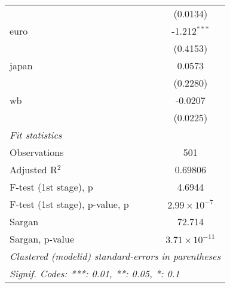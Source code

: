 \begin{tabular}{lc}
                                  & (0.0134)\\   
   euro                           & -1.212$^{***}$\\   
                                  & (0.4153)\\   
   japan                          & 0.0573\\   
                                  & (0.2280)\\   
   wb                             & -0.0207\\   
                                  & (0.0225)\\   
   \midrule
   \emph{Fit statistics}\\
   Observations                   & 501\\  
   Adjusted R$^2$                 & 0.69806\\  
   F-test (1st stage), p          & 4.6944\\  
   F-test (1st stage), p-value, p & $2.99\times 10^{-7}$\\   
   Sargan                         & 72.714\\  
   Sargan, p-value                & $3.71\times 10^{-11}$\\   
   \midrule \midrule
   \multicolumn{2}{l}{\emph{Clustered (modelid) standard-errors in parentheses}}\\
   \multicolumn{2}{l}{\emph{Signif. Codes: ***: 0.01, **: 0.05, *: 0.1}}\\
\end{tabular}
\par\endgroup


